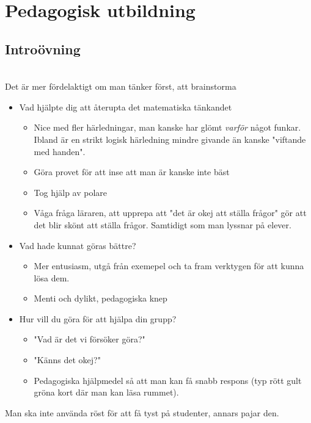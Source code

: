 \section{Pedagogisk utbildning}

\subsection{Introövning}\hfill\\

\noindent Det är mer fördelaktigt om man tänker först, att brainstorma

\begin{itemize}
  \item Vad hjälpte dig att återupta det matematiska tänkandet
    \begin{itemize}
      \item Nice med fler härledningar, man kanske har glömt \textit{varför} något funkar. Ibland är en strikt logisk härledning mindre givande än kanske "viftande med handen".
      \item Göra provet för att inse att man är kanske inte bäst
      \item Tog hjälp av polare
      \item Våga fråga läraren, att upprepa att "det är okej att ställa frågor" gör att det blir skönt att ställa frågor. Samtidigt som man lyssnar på elever.
    \end{itemize}
  \item Vad hade kunnat göras bättre?
    \begin{itemize}
      \item Mer entusiasm, utgå från exemepel och ta fram verktygen för att kunna lösa dem.
      \item Menti och dylikt, pedagogiska knep
    \end{itemize}
  \item Hur vill du göra för att hjälpa din grupp?
    \begin{itemize}
      \item "Vad är det vi försöker göra?"
      \item "Känns det okej?"
      \item Pedagogiska hjälpmedel så att man kan få snabb respons (typ rött gult gröna kort där man kan läsa rummet).
    \end{itemize}
\end{itemize}
\par\bigskip
\noindent Man ska inte använda röst för att få tyst på studenter, annars pajar den.

